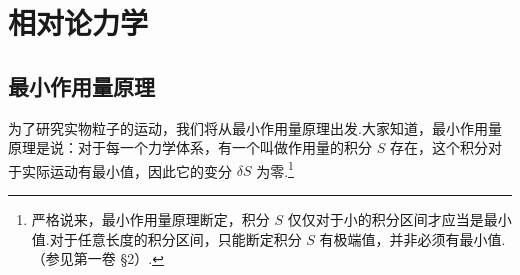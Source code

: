 \chapter{相对论力学}

\section{最小作用量原理}

为了研究实物粒子的运动，我们将从最小作用量原理出发.大家知道，最小作用量原理是说：对于每一个力学体系，有一个叫做作用量的积分 $S$ 存在，这个积分对于实际运动有最小值，因此它的变分 $\delta S$ 为零.\footnote{严格说来，最小作用量原理断定，积分 $S$ 仅仅对于小的积分区间才应当是最小值.对于任意长度的积分区间，只能断定积分 $S$ 有极端值，并非必须有最小值.（参见第一卷 §2）.}

